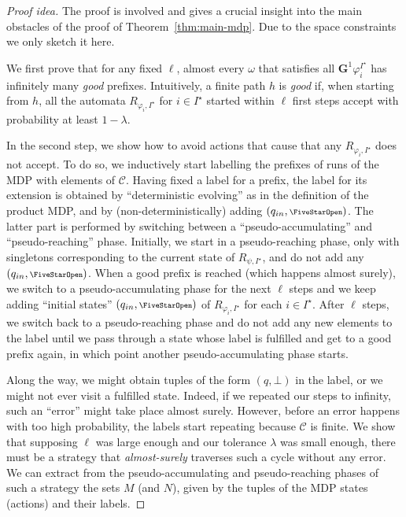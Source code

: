 \documentclass[a4paper,UKenglish]{lipics}
\newcommand{\symbopen}{\text{\scriptsize\FiveStarOpen}}
\newcommand{\Gf}[1]{\mathbf{G}^{#1}}
\newcommand{\rabin}{R}
\newcommand{\fix}[1]{{#1^\star}}
\newcommand{\fixI}{\fix{I}}
\begin{document}
\begin{proof}[Proof idea]
	The proof is involved and gives a crucial insight into the main obstacles of the proof of Theorem~\ref{thm:main-mdp}.
	Due to the space constraints we only sketch it here.
	
	We first prove that for any fixed $\ell$, almost every $\omega$ that satisfies all $\Gf{1} \varphi^\fixI_i$ has infinitely many {\em good} prefixes. Intuitively, a finite path $h$ is \emph{good} if, when starting from $h$,
	all the automata $\rabin_{\varphi_i,\fixI}$ for $i\in \fixI$ started within $\ell$ first steps accept with probability at least $1-\lambda$.
	
	In the second step, we show how to avoid actions that cause that any $\rabin_{\varphi_i,\fixI}$ does not accept.
To do so, we inductively start labelling the prefixes of runs of the MDP with elements of $\mathcal{C}$. Having fixed a label for a prefix, the label for its extension is obtained by ``deterministic evolving'' as in the definition of the product MDP, and by (non-deterministically) adding $(q_{in},\symbopen)$.
	The latter part is performed by switching between a ``pseudo-accumulating'' and ``pseudo-reaching'' phase. Initially, we start in a pseudo-reaching phase, only with singletons corresponding to the current state of $\rabin_{\psi,\fixI}$, and do not add any $(q_{in},\symbopen)$. When a good prefix is reached (which happens almost surely), we switch to a pseudo-accumulating phase for the next $\ell$ steps and we keep adding ``initial states'' $(q_{in},\symbopen)$ of $\rabin_{\varphi_i,\fixI}$ for each $i\in\fixI$. After $\ell$ steps, we switch back to a pseudo-reaching phase and do not add any new elements to the label until we pass through a state whose label is fulfilled and get to a good prefix again, in which point another pseudo-accumulating phase starts.
	
	Along the way, we might obtain tuples of the form $(q,\bot)$ in the label, or we might not ever visit a fulfilled state. Indeed, if we repeated our steps to infinity, such an ``error'' might take place almost surely. However, before an error happens with too high probability, the labels start repeating because $\mathcal{C}$ is finite. 
We show that supposing $\ell$ was large enough and our tolerance $\lambda$ was small enough, there must be a strategy that \emph{almost-surely} traverses such a cycle without any error.
We can extract from the pseudo-accumulating and pseudo-reaching phases of such a strategy the sets $M$ (and $N$), given by the tuples of the MDP states (actions) and their labels.
\end{proof}
\end{document}
